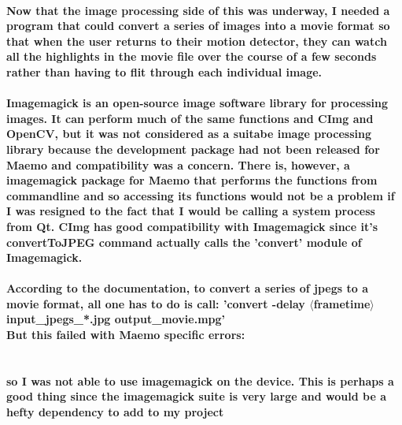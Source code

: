 \documentclass[11pt]{article} %
\begin{document}
\paragraph{Now that the image processing side of this was underway, I needed a program that could convert a series of images into a movie format so that when the user returns to their motion detector, they can watch all the highlights in the movie file over the course of a few seconds rather than having to flit through each individual image.
}
\paragraph{Imagemagick is an open-source image software library for processing images. It can perform much of the same functions and CImg and OpenCV, but it was not considered as a suitabe image processing library because the development package had not been released for Maemo and compatibility was a concern. There is, however, a imagemagick package for Maemo that performs the functions from commandline and so accessing its functions would not be a problem if I was resigned to the fact that I would be calling a system process from Qt. CImg has good compatibility with Imagemagick since it's convertToJPEG command actually calls the 'convert' module of Imagemagick.}
\paragraph{
According to the documentation, to convert a series of jpegs to a movie format, all one has to do is call:
'convert -delay \(\langle\)frametime\(\rangle\) input\_jpegs\_*.jpg output\_movie.mpg'\\
But this failed with Maemo specific errors:\\\\}
\begin{frame}[fragile]

\end{frame}
\paragraph{so I was not able to use imagemagick on the device. This is perhaps a good thing since the imagemagick suite is very large and would be a hefty dependency to add to my project
}
\end{document}

